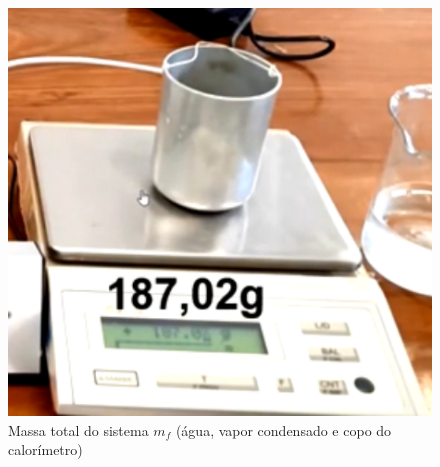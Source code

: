 \begin{figure}[H]
  \centering
  \includegraphics[scale=0.6]{images/Massa total do sistema.png}
  \caption{Massa total do sistema $m_f$ (água, vapor condensado e copo do calorímetro)}
\end{figure}
